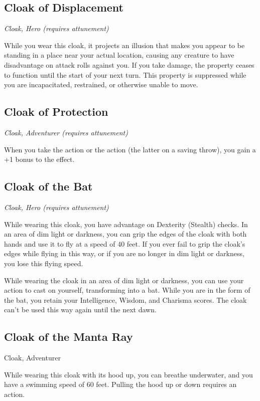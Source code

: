 \subsection{Cloak of Displacement}
\textit{Cloak, Hero (requires attunement)}

While you wear this cloak, it projects an illusion that makes you appear to be standing in a place near your actual location, causing any creature to have disadvantage on attack rolls against you. If you take damage, the property ceases to function until the start of your next turn. This property is suppressed while you are incapacitated, restrained, or otherwise unable to move.

\subsection{Cloak of Protection}
\textit{Cloak, Adventurer (requires attunement)}

When you take the  action or the  action (the latter on a saving throw), you gain a +1 bonus to the effect.

\subsection{Cloak of the Bat}
\textit{Cloak, Hero (requires attunement)}

While wearing this cloak, you have advantage on Dexterity (Stealth) checks. In an area of dim light or darkness, you can grip the edges of the cloak with both hands and use it to fly at a speed of 40 feet. If you ever fail to grip the cloak's edges while flying in this way, or if you are no longer in dim light or darkness, you lose this flying speed.

While wearing the cloak in an area of dim light or darkness, you can use your action to cast  on yourself, transforming into a bat. While you are in the form of the bat, you retain your Intelligence, Wisdom, and Charisma scores. The cloak can't be used this way again until the next dawn.

\subsection{Cloak of the Manta Ray}
Cloak, Adventurer

While wearing this cloak with its hood up, you can breathe underwater, and you have a swimming speed of 60 feet. Pulling the hood up or down requires an action.

